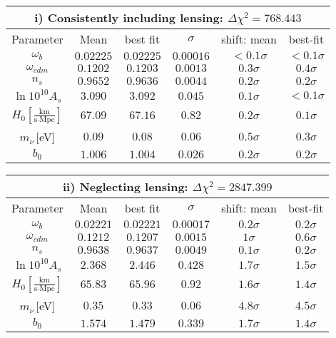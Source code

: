 \begin{table}[!t]
\centering
\begin{tabular}{@{}cccccc}
\hline
\multicolumn{6}{c}{i) Consistently including lensing: $\Delta \chi^2 = 768.443$} \\
\hline
Parameter & Mean & best fit & $\sigma$ &\hspace{-0.52cm} shift: mean & best-fit \\
\hline
$\omega_b$ & $0.02225$ & $0.02225 $ &$0.00016 $ &  \quad$<0.1\sigma$ & $ <0.1\sigma$ \\
$\omega_{cdm}$ & $0.1202 $ & $0.1203 $ & \quad$0.0013 $ &  \quad$0.3\sigma$ & $0.4\sigma$ \\
$n_s$      & $0.9652 $ & $0.9636 $ & $0.0044 $ &  \quad$0.2\sigma$ & $ 0.2\sigma$ \\
$\ln10^{10}A_s$ & $3.090 $ & $3.092$ & $0.045 $ &  \quad$0.1\sigma$ & $ <0.1\sigma$ \\
$H_0\left[\frac{\text{km}}{\text{s}\cdot\text{Mpc}}\right]$      & $67.09$ & $67.16$ & $0.82$ &  \quad$0.2\sigma$ & $ 0.1\sigma$ \\
$m_{\nu}$\,[eV]  & $0.09$ & $0.08$ & $0.06$ & \quad $ 0.5\sigma$ & $ 0.3\sigma$ \\
$b_0$ & $1.006$ & $1.004$ & $0.026$ & $0.2\sigma$ & $0.2\sigma$ \\
\end{tabular}
\begin{tabular}{@{}cccccc}
\hline
\multicolumn{6}{c}{ii) Neglecting lensing: $\Delta \chi^2 = 2847.399$} \\
\hline
Parameter & Mean & best fit & $\sigma$ & \hspace{-0.52cm} shift: mean & best-fit \\
\hline
$\omega_b$ & $0.02221$ & $0.02221 $ & $0.00017 $ &  \quad$0.2\sigma$ & $0.2\sigma$ \\
$\omega_{cdm}$ & $0.1212$ & $0.1207$ & $0.0015$ &  \quad$1\sigma$ & $0.6\sigma$ \\
$n_s$      & $0.9638$ & $0.9637$ & $0.0049$ &  \quad$0.1\sigma$ & $0.2\sigma$ \\
$\ln10^{10}A_s$ & $ 2.368 $ & $2.446 $ & $ 0.428 $ &  \quad$1.7\sigma$ & $1.5\sigma$ \\
$H_0\left[\frac{\text{km}}{\text{s}\cdot\text{Mpc}}\right]$      & $65.83$ & $65.96$ & $0.92$ &  \quad$1.6\sigma$ & $1.4\sigma$ \\
$m_{\nu}$\,[eV]  & $0.35$ & $0.33$ & $0.06$ &  \quad$4.8\sigma$ & $4.5\sigma$ \\
$b_0$ & $1.574$ & $1.479$ & $0.339$ & $1.7\sigma$ & $1.4\sigma$\\

\end{tabular}
\end{table}
